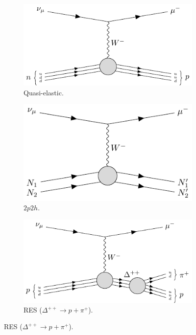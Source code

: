 \begin{figure}[t]
	\begin{subfigure}{0.5\textwidth}
		\centering
		\includegraphics[width=.90\linewidth]{Images/Nu/feynman_ccqel.pdf}
		\caption{Quasi-elastic.}
	\end{subfigure}
	\begin{subfigure}{0.5\textwidth}
		\centering
		\includegraphics[width=.90\linewidth]{Images//Nu/feynman_ccmec.pdf}
		\caption{$2p2h$.}
	\end{subfigure}
	\begin{subfigure}{0.5\textwidth}
		\centering
		\includegraphics[width=.90\linewidth]{Images//Nu/feynman_ccres_delta++.pdf}
		\caption{RES ($\Delta^{++} \rightarrow p + \pi^{+}$).}
	\end{subfigure}

\end{figure}
